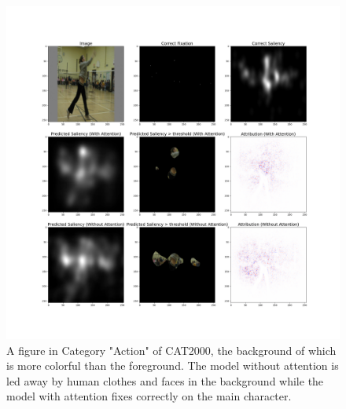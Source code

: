 \documentclass[12pt]{article}
\begin{document}
\begin{figure}[!h]
    \centering
    \includegraphics[width=7in]{imgs/used_example_1.png}
    \caption{A figure in Category "Action" of CAT2000, the background of which is more colorful than the foreground. The model without attention is led away by human clothes and faces in the background while the model with attention fixes correctly on the main character.}
    \label{img:int_example_1}
\end{figure}
\end{document}
